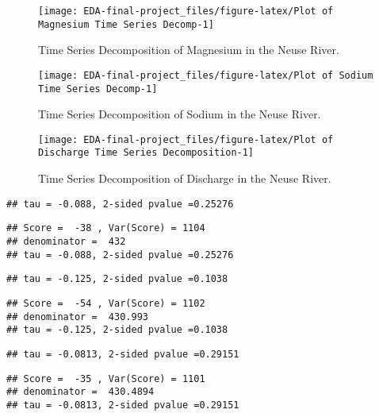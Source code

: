 \documentclass[
  12pt,
]{article}
\begin{document}
\begin{figure}

\texttt{[image: EDA-final-project\_files/figure-latex/Plot of Magnesium Time Series Decomp-1]} \hfill{}

\caption{Time Series Decomposition of Magnesium in the Neuse River.}\label{fig:Plot of Magnesium Time Series Decomp}
\end{figure}

\begin{figure}

\texttt{[image: EDA-final-project\_files/figure-latex/Plot of Sodium Time Series Decomp-1]} \hfill{}

\caption{Time Series Decomposition of Sodium in the Neuse River.}\label{fig:Plot of Sodium Time Series Decomp}
\end{figure}

\begin{figure}

\texttt{[image: EDA-final-project\_files/figure-latex/Plot of Discharge Time Series Decomposition-1]} \hfill{}

\caption{Time Series Decomposition of Discharge in the Neuse River.}\label{fig:Plot of Discharge Time Series Decomposition}
\end{figure}

\begin{verbatim}
## tau = -0.088, 2-sided pvalue =0.25276
\end{verbatim}

\begin{verbatim}
## Score =  -38 , Var(Score) = 1104
## denominator =  432
## tau = -0.088, 2-sided pvalue =0.25276
\end{verbatim}

\begin{verbatim}
## tau = -0.125, 2-sided pvalue =0.1038
\end{verbatim}

\begin{verbatim}
## Score =  -54 , Var(Score) = 1102
## denominator =  430.993
## tau = -0.125, 2-sided pvalue =0.1038
\end{verbatim}

\begin{verbatim}
## tau = -0.0813, 2-sided pvalue =0.29151
\end{verbatim}

\begin{verbatim}
## Score =  -35 , Var(Score) = 1101
## denominator =  430.4894
## tau = -0.0813, 2-sided pvalue =0.29151
\end{verbatim}
\end{document}
